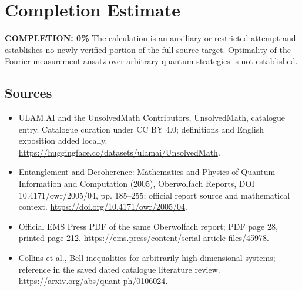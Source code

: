 \documentclass[11pt]{article}
\begin{document}
\section{Completion Estimate}
\noindent\textbf{COMPLETION: 0\%}
The calculation is an auxiliary or restricted attempt and establishes no newly verified portion of the full source target. Optimality of the Fourier measurement ansatz over arbitrary quantum strategies is not established.

\subsection{Sources}
\begin{itemize}
\item[\hypertarget{source:statement:1}{S1}] ULAM.AI and the UnsolvedMath Contributors, UnsolvedMath, catalogue entry. Catalogue curation under CC BY 4.0; definitions and English exposition added locally.
\url{https://huggingface.co/datasets/ulamai/UnsolvedMath}.
\item[\hypertarget{source:statement:2}{S2}] Entanglement and Decoherence: Mathematics and Physics of Quantum Information and Computation (2005), Oberwolfach Reports, DOI 10.4171/owr/2005/04, pp. 185--255; official report source and mathematical context.
\url{https://doi.org/10.4171/owr/2005/04}.
\item[\hypertarget{source:statement:3}{S3}] Official EMS Press PDF of the same Oberwolfach report; PDF page 28, printed page 212.
\url{https://ems.press/content/serial-article-files/45978}.
\item[\hypertarget{source:statement:4}{S4}] Collins et al., Bell inequalities for arbitrarily high-dimensional systems; reference in the saved dated catalogue literature review.
\url{https://arxiv.org/abs/quant-ph/0106024}.
\end{itemize}
\label{end:statement}
\end{document}
